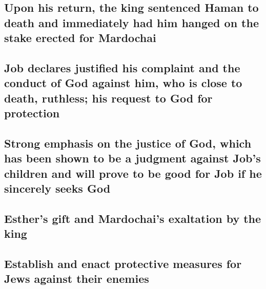 \hypertarget{upon-his-return-the-king-sentenced-haman-to-death-and-immediately-had-him-hanged-on-the-stake-erected-for-mardochai}{%
\subsection{Upon his return, the king sentenced Haman to death and
immediately had him hanged on the stake erected for
Mardochai}\label{upon-his-return-the-king-sentenced-haman-to-death-and-immediately-had-him-hanged-on-the-stake-erected-for-mardochai}}

\hypertarget{job-declares-justified-his-complaint-and-the-conduct-of-god-against-him-who-is-close-to-death-ruthless-his-request-to-god-for-protection}{%
\subsection{Job declares justified his complaint and the conduct of God
against him, who is close to death, ruthless; his request to God for
protection}\label{job-declares-justified-his-complaint-and-the-conduct-of-god-against-him-who-is-close-to-death-ruthless-his-request-to-god-for-protection}}

\hypertarget{strong-emphasis-on-the-justice-of-god-which-has-been-shown-to-be-a-judgment-against-jobs-children-and-will-prove-to-be-good-for-job-if-he-sincerely-seeks-god}{%
\subsection{Strong emphasis on the justice of God, which has been shown
to be a judgment against Job's children and will prove to be good for
Job if he sincerely seeks
God}\label{strong-emphasis-on-the-justice-of-god-which-has-been-shown-to-be-a-judgment-against-jobs-children-and-will-prove-to-be-good-for-job-if-he-sincerely-seeks-god}}

\hypertarget{esthers-gift-and-mardochais-exaltation-by-the-king}{%
\subsection{Esther's gift and Mardochai's exaltation by the
king}\label{esthers-gift-and-mardochais-exaltation-by-the-king}}

\hypertarget{establish-and-enact-protective-measures-for-jews-against-their-enemies}{%
\subsection{Establish and enact protective measures for Jews against
their
enemies}\label{establish-and-enact-protective-measures-for-jews-against-their-enemies}}

